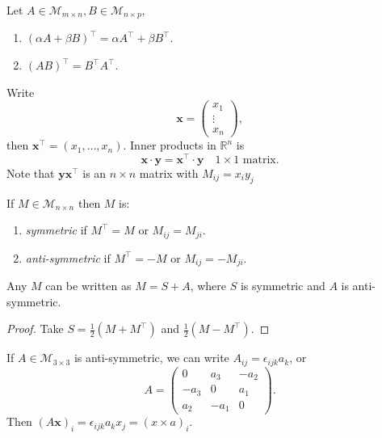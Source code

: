 \documentclass[a4paper]{article}
\begin{document}
    \begin{proposition}[Properties]
      Let $ A\in \mathcal{M}_{m\times n}, B\in \mathcal{M}_{n\times p} $,
      \begin{enumerate}
        \item $ (\alpha A+\beta B)^{\top}=\alpha A^{\top}+\beta B^{\top} $.
        \item $ (AB)^{\top}=B^{\top}A^{\top} $.
      \end{enumerate}
    \end{proposition}
    \begin{remark}
      Write
      \[
        \mathbf{x}=
        \begin{pmatrix}
          x_1\\\vdots\\x_n
        \end{pmatrix}
      ,\]
      then $ \mathbf{x}^{\top}=(x_1,\dots,x_n) $. Inner products in $
      \mathbb{R}^{n} $ is
      \[
        \mathbf{x}\cdot \mathbf{y}=\mathbf{x}^{\top} \cdot
        \mathbf{y}\quad 1 \times 1 \text{ matrix}
      .\]
      Note that $ \mathbf{y}\mathbf{x}^{\top} $ is an $ n \times n $
      matrix with $ M_{ij}=x_iy_j $
    \end{remark}
    \begin{definition}
      If $ M\in \mathcal{M}_{n\times n} $ then $M$ is:
      \begin{enumerate}
        \item \textit{symmetric} if $ M^{\top}=M $ or $ M_{ij}=M_{ji} $.
        \item \textit{anti-symmetric} if $ M^{\top}=-M $ or $ M_{ij}=-M_{ji} $.
      \end{enumerate}
    \end{definition}
    \begin{proposition}
      Any $ M $ can be written as $ M=S+A $, where $S$ is symmetric
      and $A$ is anti-symmetric.
    \end{proposition}
    \begin{proof}
      Take $ S=\frac{1}{2}(M+M^{\top}) $ and $ \frac{1}{2}(M-M^{\top}) $.
    \end{proof}
    \begin{remark}
      If $ A\in \mathcal{M}_{3\times 3} $ is anti-symmetric, we can
      write $ A_{ij}=\epsilon_{ijk}a_k $, or
      \[
        A=
        \begin{pmatrix}
          0&a_3&-a_2\\
          -a_3&0&a_1\\
          a_2&-a_1&0
        \end{pmatrix}
      .\]
      Then $ (A \mathbf{x})_{i}=\epsilon_{ijk}a_kx_j=(x \times a)_{i} $.
    \end{remark}
\end{document}
